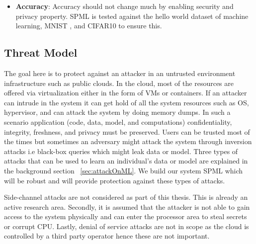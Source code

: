 \begin{itemize}
  \vspace{-0.3cm}\item \textbf{Accuracy}: Accuracy should not change much by enabling security and privacy property. SPML is tested against the hello world dataset of machine learning, MNIST \cite{12}, and CIFAR10 \cite{13} to ensure this.
\end{itemize} 
\subsection{Threat Model}
The goal here is to protect against an attacker in an untrusted environment infrastructure such as public clouds. In the cloud, most of the resources are offered via virtualization either in the form of VMs or containers. If an attacker can intrude in the system it can get hold of all the system resources such as OS, hypervisor, and can attack the system by doing memory dumps. In such a scenario application (code, data, model, and computations) confidentiality, integrity, freshness, and privacy must be preserved. Users can be trusted most of the times but sometimes an adversary might attack the system through inversion attacks i.e black-box queries which might leak data or model. Three types of attacks that can be used to learn an individual's data or model are explained in the background section ~\ref{sec:attackOnML}. We build our system SPML which will be robust and will provide protection against these types of attacks.

Side-channel attacks are not considered as part of this thesis. This is already an active research area. Secondly, it is assumed that the attacker is not able to gain access to the system physically and can enter the processor area to steal secrets or corrupt CPU. Lastly, denial of service attacks are not in scope as the cloud is controlled by a third party operator hence these are not important.


